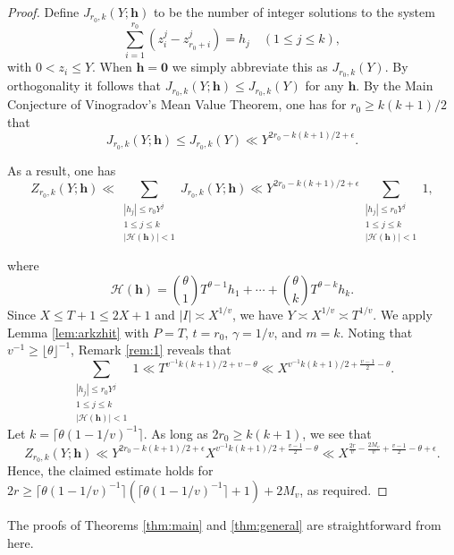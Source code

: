 \documentclass[11pt,reqno]{amsart}
\numberwithin{equation}{section}
\begin{document}
\begin{proof}
Define $J_{r_0,k}(Y; \mathbf{h})$ to be the number of integer solutions to the system 
\[ \sum_{i=1}^{r_0} (z_i^j - z_{r_0+i}^j) = h_j \quad (1 \leq j \leq k), \]
with $0 < z_i \leq Y$. When $\mathbf{h} = \mathbf{0}$ we simply abbreviate this as $J_{r_0,k}(Y)$. By orthogonality it follows that $J_{r_0,k}(Y; \mathbf{h}) \leq J_{r_0,k}(Y)$ for any $\mathbf{h}$. By the Main Conjecture of Vinogradov's Mean Value Theorem, one has for $r_0 \geq k(k+1)/2$ that 
\[ J_{r_0,k}(Y; \mathbf{h}) \leq J_{r_0,k}(Y) \ll Y^{2r_0-k(k+1)/2+\epsilon}. \]

As a result, one has 
\[ Z_{r_0,k}(Y; \mathbf{h}) \ll \sum_{\substack{ |h_j| \leq r_0Y^j \\ 1 \leq j \leq k \\ |\mathcal{H}(\mathbf{h})| < 1 }} J_{r_0,k}(Y; \mathbf{h}) \ll Y^{2r_0- k(k+1)/2 + \epsilon} \sum_{\substack{ |h_j| \leq r_0Y^j \\ 1 \leq j \leq k \\ |\mathcal{H}(\mathbf{h})| < 1 }} 1, \]

where 
\[\mathcal{H}(\mathbf{h}) = \binom{\theta}{1}T^{\theta-1}h_1+\cdots+\binom{\theta}{k} T^{\theta-k}h_k. \] 
Since $X \leq T+1 \leq 2X+1$ and $|I| \asymp X^{1/v}$, we have $Y \asymp X^{1/v} \asymp T^{1/v}$. We apply Lemma \ref{lem:arkzhit} with $P = T$, $t = r_0$, $\gamma = 1/v$, and $m = k$. Noting that $v^{-1} \geq \lfloor \theta \rfloor^{-1}$, Remark \ref{rem:1} reveals that 
\[ \sum_{\substack{ |h_j| \leq r_0Y^j \\ 1 \leq j \leq k \\ |\mathcal{H}(\mathbf{h})| < 1 }} 1 \ll T^{v^{-1} k(k+1)/2+\upsilon-\theta} \ll X^{v^{-1} k(k+1)/2+\frac{v-1}{2}-\theta}. \]
Let $k = \lceil \theta(1-1/v)^{-1} \rceil$. As long as $2r_0 \geq k(k+1)$, we see that 
\[ Z_{r_0,k}(Y; \mathbf{h}) \ll Y^{2r_0- k(k+1)/2 + \epsilon}X^{v^{-1} k(k+1)/2+\frac{v-1}{2}-\theta} \ll X^{\frac{2r}{v}-\frac{2M_v}{v}+\frac{v-1}{2}-\theta+\epsilon}. \]
Hence, the claimed estimate holds for $2r \geq \lceil \theta(1-1/v)^{-1} \rceil(\lceil \theta(1-1/v)^{-1} \rceil+1)+2M_v$, as required. 
\end{proof}

The proofs of Theorems \ref{thm:main} and \ref{thm:general} are straightforward from here. 
\end{document}
